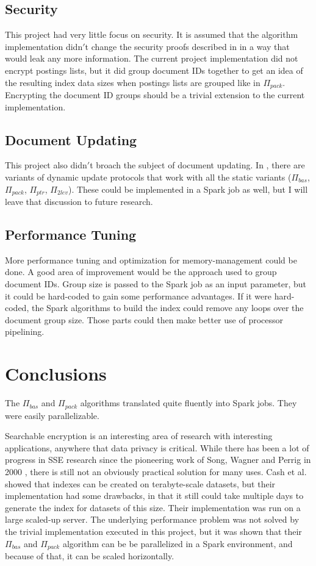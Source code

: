 \documentclass{sig-alternate-05-2015}
\begin{document}
\subsection{Security}
This project had very little focus on security. It is assumed that the algorithm implementation didn$'$t change the security proofs described in \cite{davidcashetal.2014} in a way that would leak any more information. The current project implementation did not encrypt postings lists, but it did group document IDs together to get an idea of the resulting index data sizes when postings lists are grouped like in $\Pi_{pack}$. Encrypting the document ID groups should be a trivial extension to the current implementation.

\subsection{Document Updating} 
This project also didn$'$t broach the subject of document updating. In \cite{davidcashetal.2014}, there are variants of dynamic update protocols that work with all the static variants ($\Pi_{bas}$, $\Pi_{pack}$, $\Pi_{ptr}$, $\Pi_{2lev}$). These could be implemented in a Spark job as well, but I will leave that discussion to future research.

\subsection{Performance Tuning}
More performance tuning and optimization for memory-management could be done. A good area of improvement would be the approach used to group document IDs. Group size is passed to the Spark job as an input parameter, but it could be hard-coded to gain some performance advantages. If it were hard-coded, the Spark algorithms to build the index could remove any loops over the document group size. Those parts could then make better use of processor pipelining.

\section{Conclusions}
The $\Pi_{bas}$ and $\Pi_{pack}$ algorithms translated quite fluently into Spark jobs. They were easily parallelizable. 


Searchable encryption is an interesting area of research with interesting applications, anywhere that data privacy is critical. While there has been a lot of progress in SSE research since the pioneering work of Song, Wagner and Perrig in 2000 \cite{swp.2000}, there is still not an obviously practical solution for many uses. Cash et al. showed that indexes can be created on terabyte-scale datasets, but their implementation had some drawbacks, in that it still could take multiple days to generate the index for datasets of this size. Their implementation was run on a large scaled-up server. The underlying performance problem was not solved by the trivial implementation executed in this project, but it was shown that their $\Pi_{bas}$ and $\Pi_{pack}$ algorithm can be be parallelized in a Spark environment, and because of that, it can be scaled horizontally. 
\end{document}
